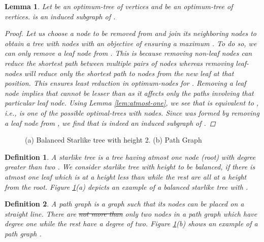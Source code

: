 \documentclass[letterpaper]{article} \usepackage{aaai20}  \usepackage{times}  \usepackage{helvet} \usepackage{courier}  \usepackage[hyphens]{url}  \usepackage{graphicx} \urlstyle{rm} \def\UrlFont{\rm}  \usepackage{graphicx}  \frenchspacing  \setlength{\pdfpagewidth}{8.5in}  \setlength{\pdfpageheight}{11in}
\newtheorem{definition}{Definition}
\newtheorem{lemma}{Lemma}
\begin{document}
	
\begin{lemma}
		\label{lem:sub-graph-optimality}
		Let  be an optimum-tree of  vertices and  be an optimum-tree of  vertices.  is an induced subgraph of .
		\begin{proof}
Let us choose a node to be removed from  and join its neighboring nodes to obtain a tree  with  nodes with an objective of ensuring a maximum . To do so, we can only remove a leaf node from . This is because removing non-leaf nodes can reduce the shortest path between multiple pairs of nodes whereas removing leaf-nodes will reduce only the shortest path to nodes from the new leaf at that position. This ensures least reduction in optimum-nodes for .
			Removing a leaf node implies that  cannot be lesser than  as it affects only the paths involving that particular leaf node. Using Lemma \ref{lem:atmost-one}, we see that  is equivalent to , i.e.,  is one of the possible optimal-trees with  nodes. Since  was formed by removing a leaf node from , we find that  is indeed an induced subgraph of .

		\end{proof}
	\end{lemma}
	
	\begin{figure}[t]
		\centering
		\caption{ (a) Balanced Starlike tree with height 2. (b) Path Graph}
		\label{fig:graphs}
	\end{figure}
	


	\begin{definition}
		A starlike tree is a tree having atmost one node (root) with degree greater than two \cite{starlike-tree}. We consider starlike tree with height  to be \textit{balanced}, if there is atmost one leaf which is at a height less than  while the rest are all at a height  from the root. Figure \ref{fig:graphs}(a) depicts an example of a balanced starlike tree with .
	\end{definition}
	
	\begin{definition}
		A path graph is a graph such that its nodes can be placed on a straight line. There are \st{not more than} only two nodes in a path graph which have degree one while the rest have a degree of two. Figure \ref{fig:graphs}(b) shows an example of a path graph \cite{path-graph}. 
	\end{definition}
\end{document}
